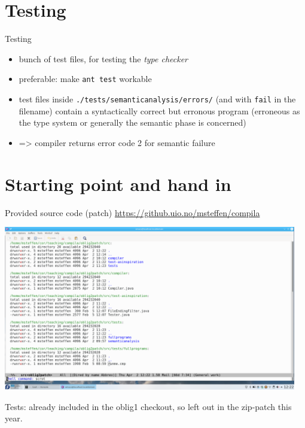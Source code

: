 \documentclass{beamer}
\begin{document}
\section{Testing}
\label{sec:org6d7df0d}
\begin{frame}[label={sec:orga08b3a7},fragile]{Testing}
 \begin{itemize}
\item bunch of test files, for testing the \emph{type checker}
\item preferable: make \texttt{ant test} workable

\item test files inside \texttt{./tests/semanticanalysis/errors/} (and with \texttt{fail} in
the filename) contain a syntactically correct but erronous program
(erroneous as the type system or generally the semantic phase is
concerned)

\item => compiler returns error code 2 for semantic failure
\end{itemize}
\end{frame}



\section{Starting point and hand in}
\label{sec:orgb0aab80}
\begin{frame}[label={sec:org2f27c92}]{Provided source code (patch)}
\url{https://github.uio.no/msteffen/compila}

\includegraphics[width=0.96\textwidth]{figures/snaps/directorystructure-src}

Tests: already included in the oblig1 checkout, so left out in the zip-patch
this year.
\end{frame}
\end{document}
